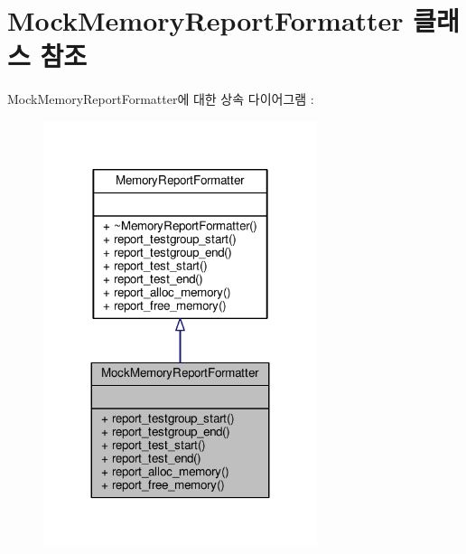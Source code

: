 \hypertarget{class_mock_memory_report_formatter}{}\section{Mock\+Memory\+Report\+Formatter 클래스 참조}
\label{class_mock_memory_report_formatter}


Mock\+Memory\+Report\+Formatter에 대한 상속 다이어그램 \+: 
\nopagebreak
\begin{figure}[H]
\begin{center}
\leavevmode
\includegraphics[width=227pt]{class_mock_memory_report_formatter__inherit__graph}
\end{center}
\end{figure}


